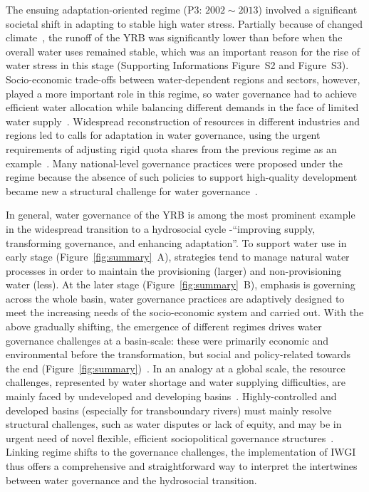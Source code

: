 \documentclass[draft]{../agujournal2019}
\begin{document}
The ensuing adaptation-oriented regime (P3: $2002 \sim 2013$) involved a significant societal shift in adapting to stable high water stress.
Partially because of changed climate~\cite{han2023,liu2020c}, the runoff of the YRB was significantly lower than before when the overall water uses remained stable, which was an important reason for the rise of water stress in this stage (Supporting Informations Figure~S2 and Figure~S3).
Socio-economic trade-offs between water-dependent regions and sectors, however, played a more important role in this regime, so water governance had to achieve efficient water allocation while balancing different demands in the face of limited water supply~\cite{dalin2015,song2022}.
Widespread reconstruction of resources in different industries and regions led to calls for adaptation in water governance, using the urgent requirements of adjusting rigid quota shares from the previous regime as an example~\cite{wang2019e}.
Many national-level governance practices were proposed under the regime because the absence of such policies to support high-quality development became new a structural challenge for water governance~\cite{konar2019}.

In general, water governance of the YRB is among the most prominent example in the widespread transition to a hydrosocial cycle -``improving supply, transforming governance, and enhancing adaptation''.
To support water use in early stage (Figure~\ref{fig:summary}~A), strategies tend to manage natural water processes in order to maintain the provisioning (larger) and non-provisioning water (less).
At the later stage (Figure~\ref{fig:summary}~B), emphasis is governing across the whole basin, water governance practices are adaptively designed to meet the increasing needs of the socio-economic system and carried out.
With the above gradually shifting, the emergence of different regimes drives water governance challenges at a basin-scale: these were primarily economic and environmental before the transformation, but social and policy-related towards the end (Figure~\ref{fig:summary})~\cite{singh2019,porcher2019}.
In an analogy at a global scale, the resource challenges, represented by water shortage and water supplying difficulties, are mainly faced by undeveloped and developing basins~\cite{allan2019,speed2013,liu2012}.
Highly-controlled and developed basins (especially for transboundary rivers) must mainly resolve structural challenges, such as water disputes or lack of equity, and may be in urgent need of novel flexible, efficient sociopolitical governance structures~\cite{unep-dhi2016,mirumachi2015}.
Linking regime shifts to the governance challenges, the implementation of IWGI thus offers a comprehensive and straightforward way to interpret the intertwines between water governance and the hydrosocial transition.
\end{document}
